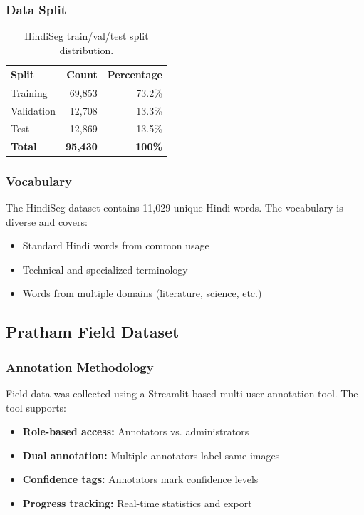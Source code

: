 \documentclass[14pt,a4paper]{article}
\begin{document}
\subsubsection{Data Split}

\begin{table}[h]
    \centering
    \begin{tabular}{lrr}
        \toprule
        \textbf{Split} & \textbf{Count} & \textbf{Percentage} \\
        \midrule
        Training & 69,853 & 73.2\% \\
        Validation & 12,708 & 13.3\% \\
        Test & 12,869 & 13.5\% \\
        \textbf{Total} & \textbf{95,430} & \textbf{100\%} \\
        \bottomrule
    \end{tabular}
    \caption{HindiSeg train/val/test split distribution.}
\end{table}

\subsubsection{Vocabulary}

The HindiSeg dataset contains 11,029 unique Hindi words. The vocabulary is diverse and covers:
\begin{itemize}
    \item Standard Hindi words from common usage
    \item Technical and specialized terminology
    \item Words from multiple domains (literature, science, etc.)
\end{itemize}

\subsection{Pratham Field Dataset}

\subsubsection{Annotation Methodology}

Field data was collected using a Streamlit-based multi-user annotation tool. The tool supports:

\begin{itemize}
    \item \textbf{Role-based access:} Annotators vs. administrators
    \item \textbf{Dual annotation:} Multiple annotators label same images
    \item \textbf{Confidence tags:} Annotators mark confidence levels
    \item \textbf{Progress tracking:} Real-time statistics and export
\end{itemize}
\end{document}
